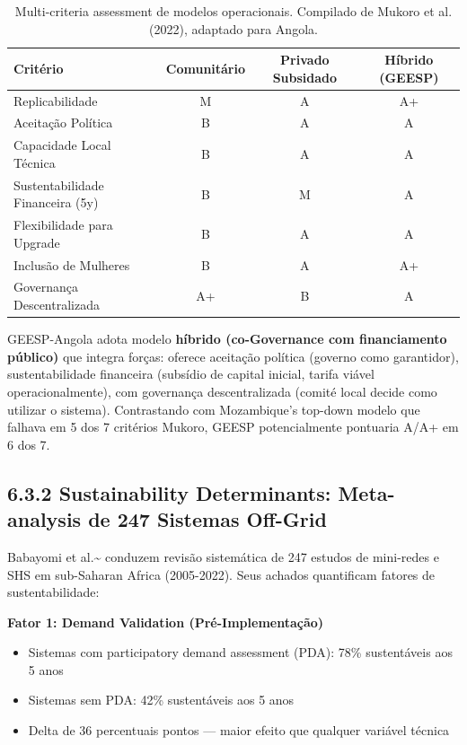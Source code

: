 \documentclass[12pt, a4paper]{article}
\begin{document}
\begin{table}[H]
\centering
\footnotesize
\begin{tabular}{lccc}
\toprule
\rowcolor{LightBlue}\textbf{Critério} & \textbf{Comunitário} & \textbf{Privado Subsidado} & \textbf{Híbrido (GEESP)} \\
\midrule
Replicabilidade & M & A & A+ \\
Aceitação Política & B & A & A \\
Capacidade Local Técnica & B & A & A \\
Sustentabilidade Financeira (5y) & B & M & A \\
Flexibilidade para Upgrade & B & A & A \\
Inclusão de Mulheres & B & A & A+ \\
Governança Descentralizada & A+ & B & A \\
\bottomrule
\end{tabular}
\caption{Multi-criteria assessment de modelos operacionais. Compilado de Mukoro et al. (2022), adaptado para Angola.}
\label{tab:business_models}
\end{table}

GEESP-Angola adota modelo \textbf{híbrido (co-Governance com financiamento público)} que integra forças: oferece aceitação política (governo como garantidor), sustentabilidade financeira (subsídio de capital inicial, tarifa viável operacionalmente), com governança descentralizada (comité local decide como utilizar o sistema). Contrastando com Mozambique's top-down modelo que falhava em 5 dos 7 critérios Mukoro, GEESP potencialmente pontuaria A/A+ em 6 dos 7.

\subsection*{6.3.2 Sustainability Determinants: Meta-analysis de 247 Sistemas Off-Grid}

Babayomi et al.\textasciitilde{}\citep{Babayomi2023} conduzem revisão sistemática de 247 estudos de mini-redes e SHS em sub-Saharan Africa (2005-2022). Seus achados quantificam fatores de sustentabilidade:

\textbf{Fator 1: Demand Validation (Pré-Implementação)}
\begin{itemize}
\item Sistemas com participatory demand assessment (PDA): 78\% sustentáveis aos 5 anos
\item Sistemas sem PDA: 42\% sustentáveis aos 5 anos
\item Delta de 36 percentuais pontos — maior efeito que qualquer variável técnica
\end{itemize}
\end{document}
